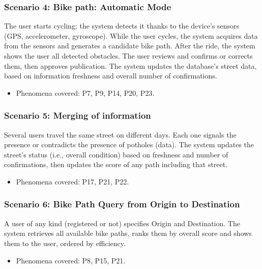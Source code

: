 \documentclass{Configuration_Files/PoliMi3i_thesis}
\begin{document}
    \subsubsection*{Scenario 4: Bike path: Automatic Mode}
    
    The user starts cycling; the system detects it thanks to the device's sensors (GPS, accelerometer, gyroscope). While the user cycles, the system acquires data from the sensors and generates a candidate bike path. After the ride, the system shows the user all detected obstacles. The user reviews and confirms or corrects them, then approves publication. The system updates the database's street data, based on information freshness and overall number of confirmations.
    
    \begin{itemize}\item{Phenomena covered: P7, P9, P14, P20, P23.}\end{itemize}
    
    \subsubsection*{Scenario 5: Merging of information}
    
    Several users travel the same street on different days. Each one signals the presence or contradicts the presence of potholes (data). The system updates the street’s status (i.e., overall condition) based on freshness and number of confirmations, then updates the score of any path including that street.
    
    \begin{itemize}\item{Phenomena covered: P17, P21, P22.}\end{itemize}
    
    \subsubsection*{Scenario 6: Bike Path Query from Origin to Destination}
    
    A user of any kind (registered or not) specifies Origin and Destination. The system retrieves all available bike paths, ranks them by overall score and shows them to the user, ordered by efficiency.
    
    \begin{itemize}\item{Phenomena covered: P8, P15, P21.}\end{itemize}
    
\end{document}
